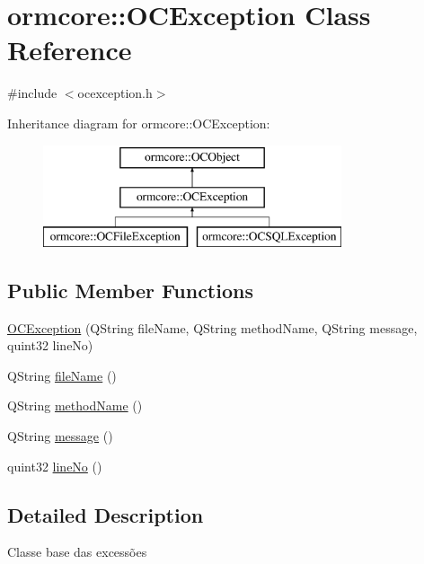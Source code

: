 \hypertarget{classormcore_1_1_o_c_exception}{
\section{ormcore\-:\-:\-O\-C\-Exception \-Class \-Reference}
\label{classormcore_1_1_o_c_exception}
}


{\ttfamily \#include $<$ocexception.\-h$>$}

\-Inheritance diagram for ormcore\-:\-:\-O\-C\-Exception\-:\begin{figure}[H]
\begin{center}
\leavevmode
\includegraphics[height=3.000000cm]{classormcore_1_1_o_c_exception}
\end{center}
\end{figure}
\subsection*{\-Public \-Member \-Functions}
\begin{DoxyCompactItemize}
\item 
\hyperlink{classormcore_1_1_o_c_exception_a6440881bb50cce3cbb632ec1495fb9aa}{\-O\-C\-Exception} (\-Q\-String file\-Name, \-Q\-String method\-Name, \-Q\-String message, quint32 line\-No)
\item 
\-Q\-String \hyperlink{classormcore_1_1_o_c_exception_afcdc3ba4ec06269e610baee1210ad2ee}{file\-Name} ()
\item 
\-Q\-String \hyperlink{classormcore_1_1_o_c_exception_a94319bc7771c56ab6797a9e4bdd0dab9}{method\-Name} ()
\item 
\-Q\-String \hyperlink{classormcore_1_1_o_c_exception_a2e21a17f2e298904f50f9f5703378515}{message} ()
\item 
quint32 \hyperlink{classormcore_1_1_o_c_exception_a4df01cf9ef5d6c3b704f4e1486163120}{line\-No} ()
\end{DoxyCompactItemize}


\subsection{\-Detailed \-Description}
\-Classe base das excessões 

